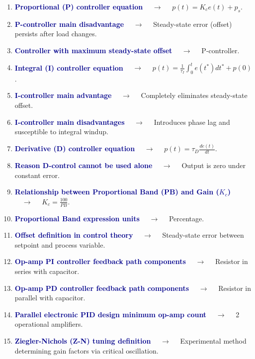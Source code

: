 \documentclass[11pt,a4paper]{article}
\begin{document}
\begin{enumerate}[label=\arabic*., leftmargin=*, labelsep=0.8em, itemsep=0.35em, parsep=0.1em, topsep=0.2em]
  \item \textcolor{darkblue}{\textbf{Proportional (P) controller equation}} $\quad\to\quad$ $p(t) = K_c e(t) + p_s$.
  \item \textcolor{darkblue}{\textbf{P-controller main disadvantage}} $\quad\to\quad$ Steady-state error (offset) persists after load changes.
  \item \textcolor{darkblue}{\textbf{Controller with maximum steady-state offset}} $\quad\to\quad$ P-controller.
  \item \textcolor{darkblue}{\textbf{Integral (I) controller equation}} $\quad\to\quad$ $p(t) = \frac{1}{\tau_I} \int_0^t e(t^*) dt^* + p(0)$.
  \item \textcolor{darkblue}{\textbf{I-controller main advantage}} $\quad\to\quad$ Completely eliminates steady-state offset.
  \item \textcolor{darkblue}{\textbf{I-controller main disadvantages}} $\quad\to\quad$ Introduces phase lag and susceptible to integral windup.
  \item \textcolor{darkblue}{\textbf{Derivative (D) controller equation}} $\quad\to\quad$ $p(t) = \tau_D \frac{de(t)}{dt}$.
  \item \textcolor{darkblue}{\textbf{Reason D-control cannot be used alone}} $\quad\to\quad$ Output is zero under constant error.
  \item \textcolor{darkblue}{\textbf{Relationship between Proportional Band (PB) and Gain ($K_c$)}} $\quad\to\quad$ $K_c = \frac{100}{PB}$.
  \item \textcolor{darkblue}{\textbf{Proportional Band expression units}} $\quad\to\quad$ Percentage.
  \item \textcolor{darkblue}{\textbf{Offset definition in control theory}} $\quad\to\quad$ Steady-state error between setpoint and process variable.
  \item \textcolor{darkblue}{\textbf{Op-amp PI controller feedback path components}} $\quad\to\quad$ Resistor in series with capacitor.
  \item \textcolor{darkblue}{\textbf{Op-amp PD controller feedback path components}} $\quad\to\quad$ Resistor in parallel with capacitor.
  \item \textcolor{darkblue}{\textbf{Parallel electronic PID design minimum op-amp count}} $\quad\to\quad$ 2 operational amplifiers.
  \item \textcolor{darkblue}{\textbf{Ziegler-Nichols (Z-N) tuning definition}} $\quad\to\quad$ Experimental method determining gain factors via critical oscillation.

\end{enumerate}
\end{document}
